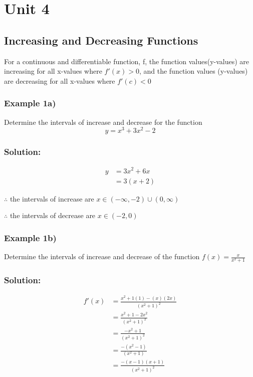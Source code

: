 \documentclass{article}
\begin{document}
\section{Unit 4}
\subsection{Increasing and Decreasing Functions}
For a continuous and differentiable function, f, the function values(y-values) are increasing for all x-values where $f'(x)>0$, and the function values (y-values) are decreasing for all x-values where $f'(c)<0$
\subsubsection{Example 1a)}
Determine the intervals of increase and decrease for the function $$y=x^3+3x^2-2$$
\subsubsection*{Solution:}
\begin{align*}
    y&=3x^2+6x\\
    &=3(x+2)
\end{align*}
\begin{center}
\end{center}

$\therefore$ the intervals of increase are $x\in(-\infty,-2)\cup(0, \infty)$

$\therefore$ the intervals of decrease are $x\in (-2,0)$

\subsubsection{Example 1b)}
Determine the intervals of increase and decrease of the function $f(x)=\frac{x}{x^2+1}$
\subsubsection*{Solution:}
\begin{align*}
    f'(x)&=\frac{x^2+1(1)-(x)(2x)}{(x^2+1)^2}\\
    &=\frac{x^2+1-2x^2}{(x^2+1)^2}\\
    &=\frac{-x^2+1}{(x^2+1)^2}\\
    &=\frac{-(x^2-1)}{(x^2+1)}\\
    &=\frac{-(x-1)(x+1)}{(x^2+1)^2}
\end{align*}
\end{document}
